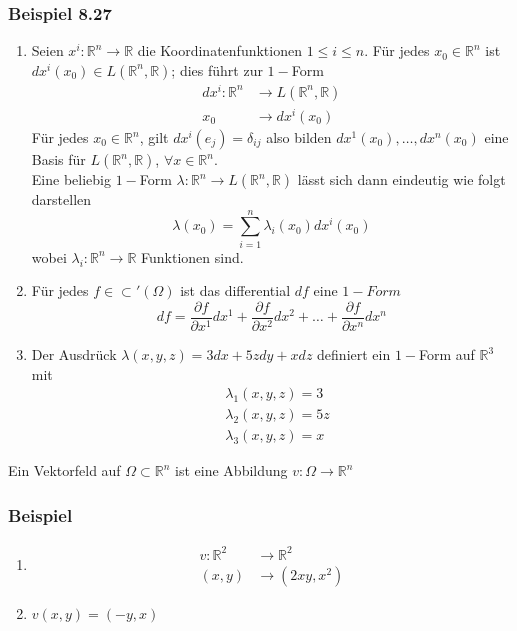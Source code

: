 \subsubsection*{Beispiel 8.27}
\begin{enumerate}
\item Seien $x^i:\mathbb{R}^n\rightarrow\mathbb{R}$ die Koordinatenfunktionen $1\leq i\leq n$. Für jedes $x_0\in\mathbb{R}^n$ ist $dx^i\left(x_0\right)\in L\left( \mathbb{R}^n,\mathbb{R}\right)$; dies führt zur $1-$Form
\begin{align*}
dx^i:\mathbb{R}^n&\rightarrow L\left( \mathbb{R}^n,\mathbb{R}\right)\\
x_0 &\rightarrow dx^i\left( x_0\right)
\end{align*}
Für jedes $x_0\in\mathbb{R}^n$, gilt $dx^i\left(e_j\right)=\delta_{ij}$ also bilden $dx^1\left( x_0\right),\dots,dx^n\left( x_0\right)$ eine Basis für $L\left(\mathbb{R}^n,\mathbb{R}\right)$, $\forall x\in\mathbb{R}^n$.\\

Eine beliebig $1-$Form $\lambda :\mathbb{R}^n\rightarrow L\left(\mathbb{R}^n,\mathbb{R}\right)$ lässt sich dann eindeutig wie folgt darstellen \[\lambda \left( {{x_0}} \right) = \sum\limits_{i = 1}^n {{\lambda _i}\left( {{x_0}} \right)d{x^i}\left( {{x_0}} \right)} \] wobei $\lambda_i:\mathbb{R}^n\rightarrow\mathbb{R}$ Funktionen sind.
\item Für jedes $f\in\subset'\left(\Omega\right)$ ist das differential $df$ eine $1-Form$ \[df = \frac{{\partial f}}{{\partial {x^1}}}d{x^1} + \frac{{\partial f}}{{\partial {x^2}}}d{x^2} +  \ldots  + \frac{{\partial f}}{{\partial {x^n}}}d{x^n}\]
\item Der Ausdrück $\lambda\left(x,y,z\right)=3dx+5zdy+xdz$ definiert ein $1-$Form auf $\mathbb{R}^3$ mit 
\begin{align*}
& \lambda_1\left(x,y,z\right)=3\\
& \lambda_2\left(x,y,z\right)=5z\\
& \lambda_3\left(x,y,z\right)=x
\end{align*}
\end{enumerate}
\begin{definition}{8.28}
Ein Vektorfeld auf $\Omega\subset\mathbb{R}^n$ ist eine Abbildung $v:\Omega\rightarrow\mathbb{R}^n$
\end{definition}

\subsubsection*{Beispiel}
\begin{enumerate}
\item \begin{align*}
v:\mathbb{R}^2 &\rightarrow\mathbb{R}^2\\
\left( x,y\right) &\rightarrow\left( 2xy,x^2\right)
\end{align*}
\item $v\left( x,y\right) = \left( -y,x\right)$
\end{enumerate}
